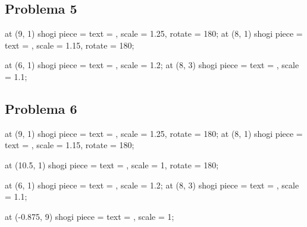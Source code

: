 \documentclass[14pt]{extarticle}
\renewcommand{\_}{\leavevmode\kern.06em\vbox{\hrule width.425em}}
\begin{document}
  \pagebreak
  
  \subsection{Problema 5}

  
  \begin{shogiban}[board dimension = 8 cm, font scale = 2.5, book style, letter ranks]
    \pic at (9, 1) {shogi piece = {text = \shogiKingGote, scale = 1.25, rotate = 180}};
    \pic at (8, 1) {shogi piece = {text = \shogiGold, scale = 1.15, rotate = 180}};
    
    \pic at (6, 1) {shogi piece = {text = \shogiRook, scale = 1.2}};
    \pic at (8, 3) {shogi piece = {text = \shogiPawn, scale = 1.1}};
  \end{shogiban}

  \subsection{Problema 6}

  
  \begin{shogiban}[board dimension = 8 cm, font scale = 2.5, book style, letter ranks]
    \pic at (9, 1) {shogi piece = {text = \shogiKingGote, scale = 1.25, rotate = 180}};
    \pic at (8, 1) {shogi piece = {text = \shogiGold, scale = 1.15, rotate = 180}};
    
    \pic at (10.5, 1) {shogi piece = {text = \shogiRook, scale = 1, rotate = 180}};

    \pic at (6, 1) {shogi piece = {text = \shogiRook, scale = 1.2}};
    \pic at (8, 3) {shogi piece = {text = \shogiPawn, scale = 1.1}};

    \pic at (-0.875, 9) {shogi piece = {text = \shogiGold, scale = 1}};
  \end{shogiban}
\end{document}
